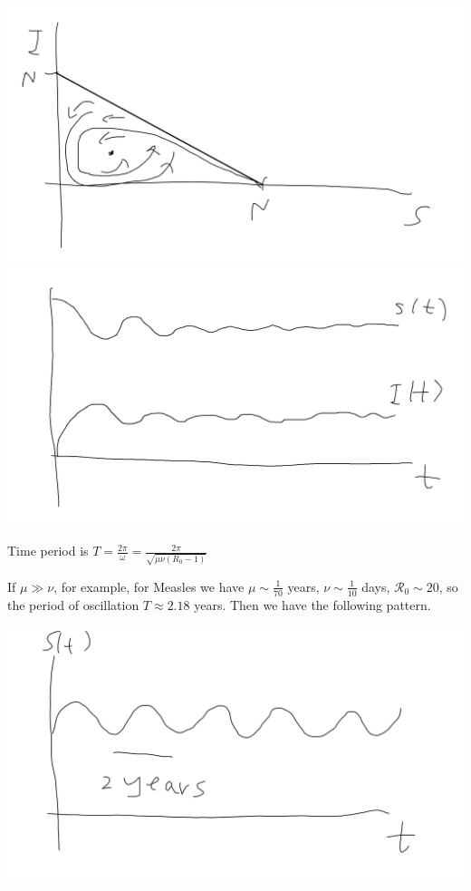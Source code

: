 \documentclass[a4paper]{article}
\begin{document}
\includegraphics[scale=0.5]{image/Bio_10.png}
\includegraphics[scale=0.5]{image/Bio_11.png}

Time period is $T = \frac{2\pi}{\omega} = \frac{2\pi}{\sqrt{\mu\nu(R_0-1)}}$

If $\mu \gg \nu$, for example, for Measles we have $\mu \sim \frac{1}{70}$ years, $\nu \sim \frac{1}{10}$ days, $\mathcal{R}_0 \sim 20$, so the period of oscillation $T \approx 2.18$ years. Then we have the following pattern.

\includegraphics[scale=0.5]{image/Bio_12.png}
\end{document}
